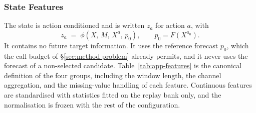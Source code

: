 \documentclass{article}
\begin{document}
\subsubsection{State Features}
\label{app:features}
The state is action conditioned and is written $z_a$ for action $a$, with
\begin{equation}
  z_a \;=\; \phi\!\left(X,\, M,\, X^{a},\, p_0\right),
  \qquad p_0 = F(X^{a_0}) .
  \label{eq:app-state}
\end{equation}
It contains no future target information. It uses the reference forecast $p_0$, which the
call budget of \S\ref{sec:method-problem} already permits, and it never uses the forecast of a
non-selected candidate. Table~\ref{tab:app-features} is the canonical definition of the four
groups, including the window length, the channel aggregation, and the missing-value handling
of each feature. Continuous features are standardised with statistics fitted on the replay
bank only, and the normalisation is frozen with the rest of the configuration.
\end{document}
